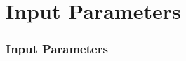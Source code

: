 \documentclass{beamer}
\providecommand{\brak}[1]{\ensuremath{\left(#1\right)}}
\theoremstyle{remark}
\providecommand{\norm}[1]{\lVert#1\rVert}
\newcommand{\myvec}[1]{\ensuremath{\begin{pmatrix}#1\end{pmatrix}}}
\let\vec\mathbf
\numberwithin{equation}{section}
\begin{document}
\section{Input Parameters}
\begin{frame}
\frametitle{Input Parameters}
\begin{table}[H]    
  \centering
  
\end{table}
\end{frame}
\end{document}
